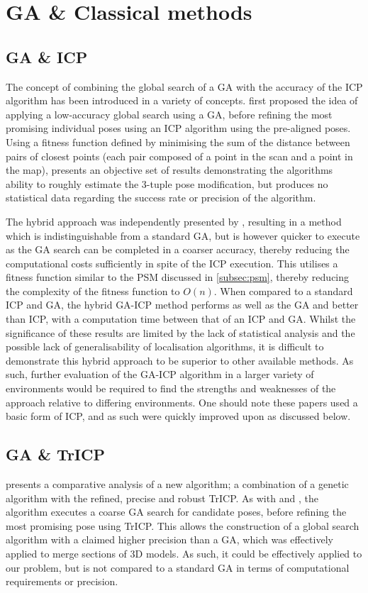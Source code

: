 \documentclass[authoryearcitations]{UoYCSproject}
\begin{document}
\section{GA \& Classical methods}
\label{sec:hybrid_approaches}
\subsection{GA \& ICP}
The concept of combining the global search of a GA with the accuracy of the ICP algorithm has been introduced in a variety of concepts. \citet{Brunnstrom1996-vo} first proposed the idea of applying a low-accuracy global search using a GA, before refining the most promising individual poses using an ICP algorithm using the pre-aligned poses. Using a fitness function defined by minimising the sum of the distance between pairs of closest points (each pair composed of a point in the scan and a point in the map), \citeauthor{Brunnstrom1996-vo} presents an objective set of results demonstrating the algorithms ability to roughly estimate the 3-tuple pose modification, but produces no statistical data regarding the success rate or precision of the algorithm. 

The hybrid approach was independently presented by \citet{Martinez2006-ci}, resulting in a method which is indistinguishable from a standard GA, but is however quicker to execute as the GA search can be completed in a coarser accuracy, thereby reducing the computational costs sufficiently in spite of the ICP execution. This utilises a fitness function similar to the PSM discussed in \ref{subsec:psm}, thereby reducing the complexity of the fitness function to $O(n)$. When compared to a standard ICP and GA, the hybrid GA-ICP method performs as well as the GA and better than ICP, with a computation time between that of an ICP and GA. Whilst the significance of these results are limited by the lack of statistical analysis and the possible lack of generalisability of localisation algorithms, it is difficult to demonstrate this hybrid approach to be superior to other available methods. As such, further evaluation of the GA-ICP algorithm in a larger variety of environments would be required to find the strengths and weaknesses of the approach relative to differing environments. One should note these papers used a basic form of ICP, and as such were quickly improved upon as discussed below.


\subsection{GA \& TrICP}
\citet{Lomonosov2006-vq} presents a comparative analysis of a new algorithm; a combination of a genetic algorithm with the refined, precise and robust TrICP. As with \cite{Brunnstrom1996-vo} and \cite{Martinez2006-ci}, the algorithm executes a coarse GA search for candidate poses, before refining the most promising pose using TrICP. This allows the construction of a global search algorithm with a claimed higher precision than a GA, which was effectively applied to merge sections of 3D models. As such, it could be effectively applied to our problem, but is not compared to a standard GA in terms of computational requirements or precision. 
\end{document}
